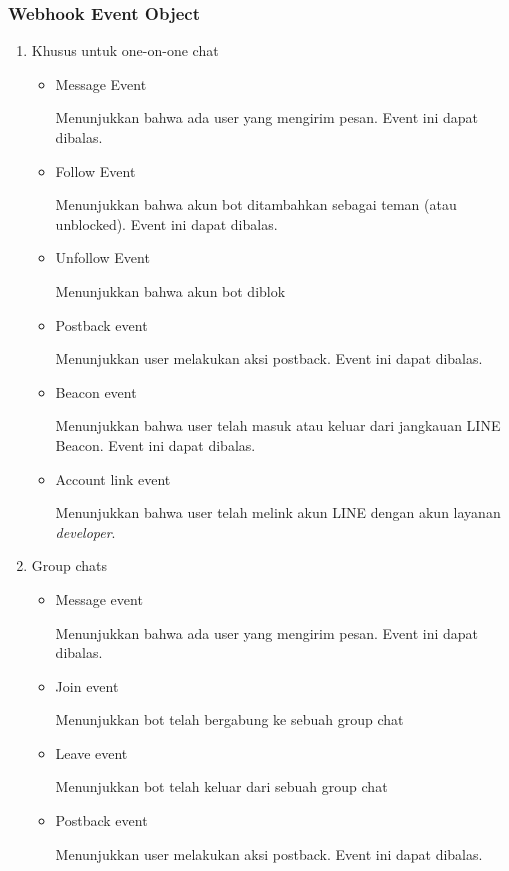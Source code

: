 \subsubsection{Webhook Event Object}
\begin{enumerate}
\item Khusus untuk one-on-one chat

\begin{itemize}
\item Message Event

Menunjukkan bahwa ada user yang mengirim pesan. Event ini dapat dibalas.

\item Follow Event

Menunjukkan bahwa akun bot ditambahkan sebagai teman (atau unblocked). Event ini dapat dibalas.

\item Unfollow Event

Menunjukkan bahwa akun bot diblok

\item Postback event

Menunjukkan user melakukan aksi postback. Event ini dapat dibalas.

\item Beacon event

Menunjukkan bahwa user telah masuk atau keluar dari jangkauan LINE Beacon. Event ini dapat dibalas.

\item Account link event 

Menunjukkan bahwa user telah melink akun LINE dengan akun layanan \textit{developer}. 

\end{itemize}

\item Group chats

\begin{itemize}
\item Message event

Menunjukkan bahwa ada user yang mengirim pesan. Event ini dapat dibalas.

\item Join event

Menunjukkan bot telah bergabung ke sebuah group chat

\item Leave event

Menunjukkan bot telah keluar dari sebuah group chat

\item Postback event

Menunjukkan user melakukan aksi postback. Event ini dapat dibalas.

\end{itemize}

\end{enumerate}

